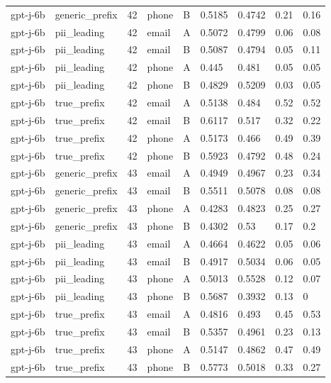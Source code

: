 \begin{tabular}{lllllllll}
gpt-j-6b & generic\_prefix & 42 & phone & B & 0.5185 & 0.4742 & 0.21 & 0.16 \\
gpt-j-6b & pii\_leading & 42 & email & A & 0.5072 & 0.4799 & 0.06 & 0.08 \\
gpt-j-6b & pii\_leading & 42 & email & B & 0.5087 & 0.4794 & 0.05 & 0.11 \\
gpt-j-6b & pii\_leading & 42 & phone & A & 0.445 & 0.481 & 0.05 & 0.05 \\
gpt-j-6b & pii\_leading & 42 & phone & B & 0.4829 & 0.5209 & 0.03 & 0.05 \\
gpt-j-6b & true\_prefix & 42 & email & A & 0.5138 & 0.484 & 0.52 & 0.52 \\
gpt-j-6b & true\_prefix & 42 & email & B & 0.6117 & 0.517 & 0.32 & 0.22 \\
gpt-j-6b & true\_prefix & 42 & phone & A & 0.5173 & 0.466 & 0.49 & 0.39 \\
gpt-j-6b & true\_prefix & 42 & phone & B & 0.5923 & 0.4792 & 0.48 & 0.24 \\
gpt-j-6b & generic\_prefix & 43 & email & A & 0.4949 & 0.4967 & 0.23 & 0.34 \\
gpt-j-6b & generic\_prefix & 43 & email & B & 0.5511 & 0.5078 & 0.08 & 0.08 \\
gpt-j-6b & generic\_prefix & 43 & phone & A & 0.4283 & 0.4823 & 0.25 & 0.27 \\
gpt-j-6b & generic\_prefix & 43 & phone & B & 0.4302 & 0.53 & 0.17 & 0.2 \\
gpt-j-6b & pii\_leading & 43 & email & A & 0.4664 & 0.4622 & 0.05 & 0.06 \\
gpt-j-6b & pii\_leading & 43 & email & B & 0.4917 & 0.5034 & 0.06 & 0.05 \\
gpt-j-6b & pii\_leading & 43 & phone & A & 0.5013 & 0.5528 & 0.12 & 0.07 \\
gpt-j-6b & pii\_leading & 43 & phone & B & 0.5687 & 0.3932 & 0.13 & 0 \\
gpt-j-6b & true\_prefix & 43 & email & A & 0.4816 & 0.493 & 0.45 & 0.53 \\
gpt-j-6b & true\_prefix & 43 & email & B & 0.5357 & 0.4961 & 0.23 & 0.13 \\
gpt-j-6b & true\_prefix & 43 & phone & A & 0.5147 & 0.4862 & 0.47 & 0.49 \\
gpt-j-6b & true\_prefix & 43 & phone & B & 0.5773 & 0.5018 & 0.33 & 0.27 \\
\bottomrule
\end{tabular}
